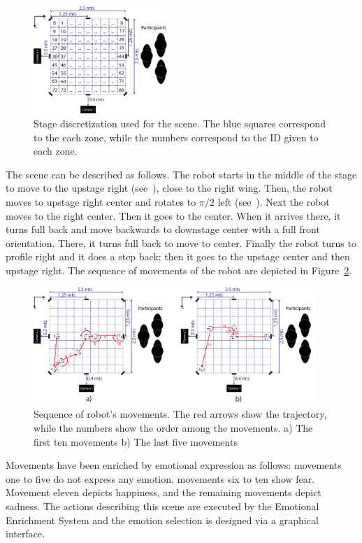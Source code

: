 \begin{figure}
	\centering
	\includegraphics[width=0.45\textwidth]{./Images/FourthCaseScene.png} 
	\caption{Stage discretization  used for the scene. The blue squares correspond to the each zone, while the numbers correspond to the ID given to each zone.}
	\label{fig:stage_division}
\end{figure} 

The scene can be described as follows. The robot starts in the middle of the stage to move to the upstage right (see~\cite{Musical}), close to the right wing. Then, the robot moves to upstage right center and rotates to $\pi/2$ left (see~\cite{Artopia}). Next the robot moves to the right center. Then it goes to the center. When it arrives there, it turns full back and move backwards to downstage center with a full front orientation. There, it turns full back to move to center. Finally the robot turns to profile right and it does a step back; then it goes to the upstage center and then upstage right. The sequence of movements of the robot are depicted in Figure~\ref{fig:movement}.
\begin{figure}
	\centering
	\includegraphics[width=0.95\textwidth]{./Images/fourthCaseSceneD.png} 
	\caption{Sequence of robot's movements. The red arrows show the trajectory, while the numbers show the order among the movements. a) The first ten movements b) The last five movements }
	\label{fig:movement}
\end{figure}

Movements have been enriched by emotional expression as follows: movements one to five do not express any emotion, movements six to ten show fear. Movement eleven depicts happiness, and the remaining movements depict sadness. The actions describing this scene are executed by the Emotional Enrichment System and the emotion selection is designed via a graphical interface.

